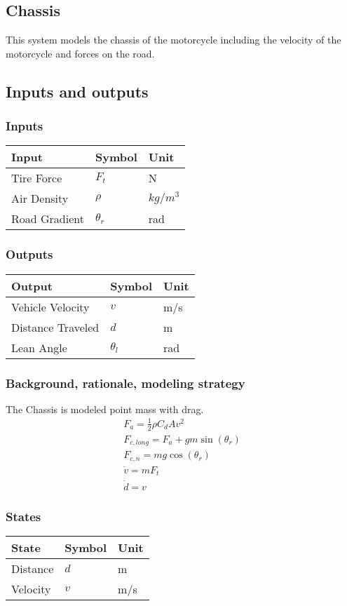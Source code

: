 \documentclass[../SimBALink.tex]{subfiles}
\begin{document}
\subsection{Chassis} This system models the chassis of the motorcycle including the velocity of the motorcycle and forces on the road.

\subsection{Inputs and outputs}
	\subsubsection{Inputs}
	\begin{tabular}{ l | l | l  }
		Input					&	Symbol		&	Unit		\\	\hline
		Tire Force				& 	$F_t$ 		&	N \\		
		Air Density 			&	$\rho$		& $kg/m^3$ \\
		Road Gradient			&	$\theta_r$  & rad
	\end{tabular}
	
	\subsubsection{Outputs}
	\begin{tabular}{ l | l | l  }
		Output					&	Symbol		&	Unit		\\	\hline
		Vehicle Velocity		&	$v$			&	m/s \\
		Distance Traveled		&	$d$			&	m \\
		Lean Angle 				&	$\theta_l$	&   rad	\\
	\end{tabular}

\subsubsection{Background, rationale, modeling strategy}
The Chassis is modeled point mass with drag.
\begin{gather}
		F_a = \frac{1}{2} \rho C_dAv^2 \\
		F_{c,long}  = F_a + gm\sin(\theta_r)  \\
		F_{c,n} = mg\cos(\theta_r) \\
		\dot{v} = mF_t \\
		\dot{d} = v
\end{gather}

\subsubsection{States}
	\begin{tabular}{ l | l | l  }
		State					&	Symbol		&	Unit		\\	\hline
		Distance				&	$d$			& 	m \\
		Velocity 				&	$v$			&	m/s \\
	\end{tabular}
\end{document}
